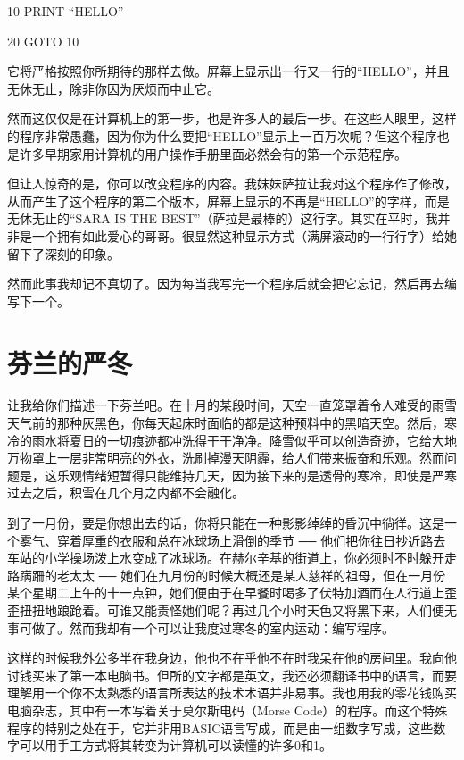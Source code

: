 10 PRINT “HELLO”

20 GOTO 10

 

它将严格按照你所期待的那样去做。屏幕上显示出一行又一行的“HELLO”，并且无休无止，除非你因为厌烦而中止它。

然而这仅仅是在计算机上的第一步，也是许多人的最后一步。在这些人眼里，这样的程序非常愚蠢，因为你为什么要把“HELLO”显示上一百万次呢？但这个程序也是许多早期家用计算机的用户操作手册里面必然会有的第一个示范程序。

但让人惊奇的是，你可以改变程序的内容。我妹妹萨拉让我对这个程序作了修改，从而产生了这个程序的第二个版本，屏幕上显示的不再是“HELLO”的字样，而是无休无止的“SARA IS THE BEST”（萨拉是最棒的）这行字。其实在平时，我并非是一个拥有如此爱心的哥哥。很显然这种显示方式（满屏滚动的一行行字）给她留下了深刻的印象。

然而此事我却记不真切了。因为每当我写完一个程序后就会把它忘记，然后再去编写下一个。

 
\section{芬兰的严冬}

让我给你们描述一下芬兰吧。在十月的某段时间，天空一直笼罩着令人难受的雨雪天气前的那种灰黑色，你每天起床时面临的都是这种预料中的黑暗天空。然后，寒冷的雨水将夏日的一切痕迹都冲洗得干干净净。降雪似乎可以创造奇迹，它给大地万物罩上一层非常明亮的外衣，洗刷掉漫天阴霾，给人们带来振奋和乐观。然而问题是，这乐观情绪短暂得只能维持几天，因为接下来的是透骨的寒冷，即使是严寒过去之后，积雪在几个月之内都不会融化。

到了一月份，要是你想出去的话，你将只能在一种影影绰绰的昏沉中徜徉。这是一个雾气、穿着厚重的衣服和总在冰球场上滑倒的季节 ── 他们把你往日抄近路去车站的小学操场泼上水变成了冰球场。在赫尔辛基的街道上，你必须时不时躲开走路蹒跚的老太太 ── 她们在九月份的时候大概还是某人慈祥的祖母，但在一月份某个星期二上午的十一点钟，她们便由于在早餐时喝多了伏特加酒而在人行道上歪歪扭扭地踉跄着。可谁又能责怪她们呢？再过几个小时天色又将黑下来，人们便无事可做了。然而我却有一个可以让我度过寒冬的室内运动：编写程序。

这样的时候我外公多半在我身边，他也不在乎他不在时我呆在他的房间里。我向他讨钱买来了第一本电脑书。但所的文字都是英文，我还必须翻译书中的语言，而要理解用一个你不太熟悉的语言所表达的技术术语并非易事。我也用我的零花钱购买电脑杂志，其中有一本写着关于莫尔斯电码（Morse Code）的程序。而这个特殊程序的特别之处在于，它并非用BASIC语言写成，而是由一组数字写成，这些数字可以用手工方式将其转变为计算机可以读懂的许多0和1。

